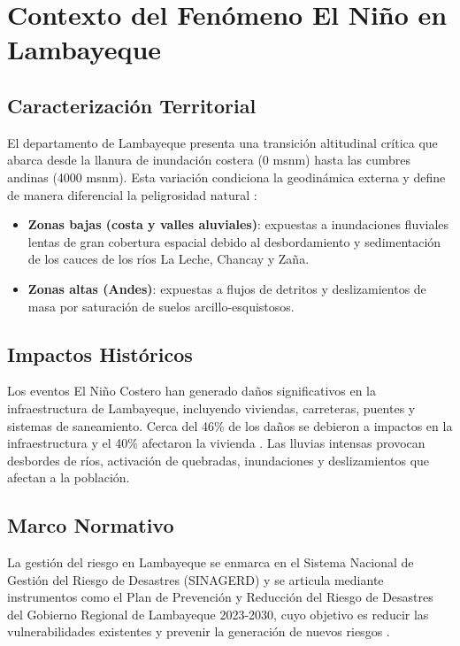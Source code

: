 \documentclass[12pt, letterpaper]{article}
\begin{document}
\section{Contexto del Fenómeno El Niño en Lambayeque}

\subsection{Caracterización Territorial}

El departamento de Lambayeque presenta una transición altitudinal crítica que abarca desde la llanura de inundación costera (0 msnm) hasta las cumbres andinas (4000 msnm). Esta variación condiciona la geodinámica externa y define de manera diferencial la peligrosidad natural \parencite{gob_regional_lambayeque_2023}:

\begin{itemize}
  \item \textbf{Zonas bajas (costa y valles aluviales)}: expuestas a inundaciones fluviales lentas de gran cobertura espacial debido al desbordamiento y sedimentación de los cauces de los ríos La Leche, Chancay y Zaña.
  \item \textbf{Zonas altas (Andes)}: expuestas a flujos de detritos y deslizamientos de masa por saturación de suelos arcillo-esquistosos.
\end{itemize}

\subsection{Impactos Históricos}

Los eventos El Niño Costero han generado daños significativos en la infraestructura de Lambayeque, incluyendo viviendas, carreteras, puentes y sistemas de saneamiento. Cerca del 46\% de los daños se debieron a impactos en la infraestructura y el 40\% afectaron la vivienda \parencite{diaz_2018}. Las lluvias intensas provocan desbordes de ríos, activación de quebradas, inundaciones y deslizamientos que afectan a la población.

\subsection{Marco Normativo}

La gestión del riesgo en Lambayeque se enmarca en el Sistema Nacional de Gestión del Riesgo de Desastres (SINAGERD) y se articula mediante instrumentos como el Plan de Prevención y Reducción del Riesgo de Desastres del Gobierno Regional de Lambayeque 2023-2030, cuyo objetivo es reducir las vulnerabilidades existentes y prevenir la generación de nuevos riesgos \parencite{gob_regional_lambayeque_2023}.
\end{document}
